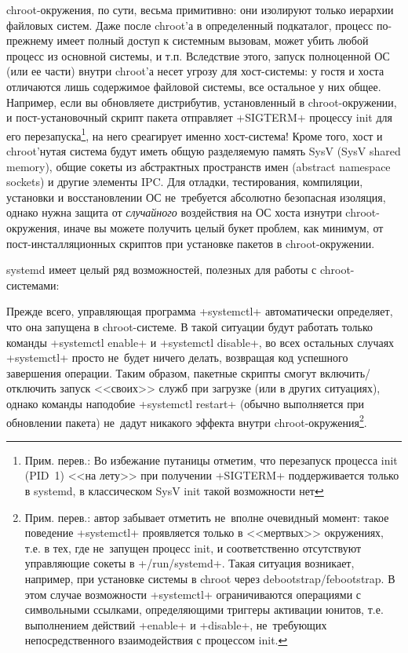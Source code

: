 \documentclass[10pt,oneside,a4paper]{article}
\begin{document}
chroot-окружения, по сути, весьма примитивно: они изолируют только иерархии
файловых систем. Даже после chroot'а в определенный подкаталог, процесс
по-прежнему имеет полный доступ к системным вызовам, может убить любой процесс
из основной системы, и т.п. Вследствие этого, запуск полноценной ОС (или ее
части) внутри chroot'а несет угрозу для хост-системы: у гостя и хоста отличаются
лишь содержимое файловой системы, все остальное у них общее. Например, если вы
обновляете дистрибутив, установленный в chroot-окружении, и пост-установочный
скрипт пакета отправляет +SIGTERM+ процессу init для его
перезапуска\footnote{Прим. перев.: Во избежание путаницы отметим, что перезапуск
процесса init (PID~1) <<на лету>> при получении +SIGTERM+ поддерживается только
в systemd, в классическом SysV init такой возможности нет}, на него среагирует
именно хост-система! Кроме того, хост и chroot'нутая система будут иметь общую
разделяемую память SysV (SysV shared memory), общие сокеты из абстрактных
пространств имен (abstract namespace sockets) и другие элементы IPC. Для
отладки, тестирования, компиляции, установки и восстановлении ОС не~требуется
абсолютно безопасная изоляция, однако нужна защита от \emph{случайного}
воздействия на ОС хоста изнутри chroot-окружения, иначе вы можете получить целый
букет проблем, как минимум, от пост-инсталляционных скриптов при установке
пакетов в chroot-окружении.

systemd имеет целый ряд возможностей, полезных для работы с chroot-системами:

Прежде всего, управляющая программа +systemctl+ автоматически определяет, что
она запущена в chroot-системе. В такой ситуации будут работать только команды
+systemctl enable+ и +systemctl disable+, во всех остальных случаях +systemctl+
просто не~будет ничего делать, возвращая код успешного завершения операции.
Таким образом, пакетные скрипты смогут включить/отключить запуск <<своих>> служб
при загрузке (или в других ситуациях), однако команды наподобие
+systemctl restart+ (обычно выполняется при обновлении пакета) не~дадут никакого
эффекта внутри chroot-окружения\footnote{Прим. перев.: автор забывает отметить
не~вполне очевидный момент: такое поведение +systemctl+ проявляется только в
<<мертвых>> окружениях, т.е. в тех, где не~запущен процесс init, и
соответственно отсутствуют управляющие сокеты в +/run/systemd+. Такая ситуация
возникает, например, при установке системы в chroot через
debootstrap/febootstrap. В этом случае возможности +systemctl+ ограничиваются
операциями с символьными ссылками, определяющими триггеры активации юнитов, т.е.
выполнением действий +enable+ и +disable+, не~требующих непосредственного
взаимодействия с процессом init.}.
\end{document}

